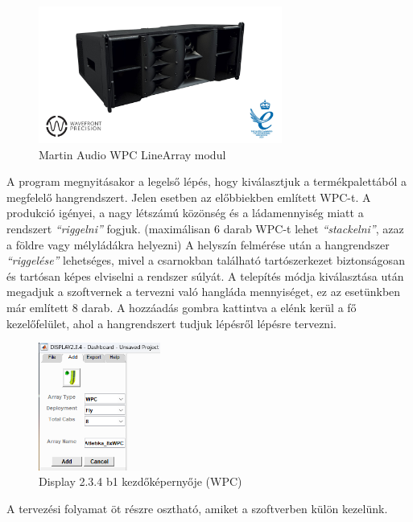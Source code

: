 \begin{figure}[H]
	\centering
	\includegraphics[width=80mm, keepaspectratio]{figures/wpc_front_view.jpg}
	\caption{Martin Audio WPC LineArray modul}\label{fig:wpc}
\end{figure}
A program megnyitásakor a legelső lépés, hogy kiválasztjuk a termékpalettából a megfelelő hangrendszert.
Jelen esetben az előbbiekben említett WPC-t. A produkció igényei, a nagy létszámú közönség és a ládamennyiség miatt a rendszert
\textit{``riggelni''} fogjuk. (maximálisan 6 darab WPC-t lehet \textit{``stackelni''}, azaz a földre vagy mélyládákra helyezni)
A helyszín felmérése után a hangrendszer \textit{``riggelése''} lehetséges, mivel a csarnokban található tartószerkezet biztonságosan
és tartósan képes elviselni a rendszer súlyát.
A telepítés módja kiválasztása után megadjuk a szoftvernek a tervezni való hangláda mennyiséget, ez az esetünkben már említett 8 darab.
A hozzáadás gombra kattintva a elénk kerül a fő kezelőfelület, ahol a hangrendszert tudjuk lépésről lépésre tervezni.
\begin{figure}[H]
	\centering
	\includegraphics[width=40mm, keepaspectratio]{figures/display_wpc_0.png}
	\caption{Display 2.3.4 b1 kezdőképernyője (WPC)}\label{fig:display_wpc_0}
\end{figure}
A tervezési folyamat öt részre osztható, amiket a szoftverben külön kezelünk.
